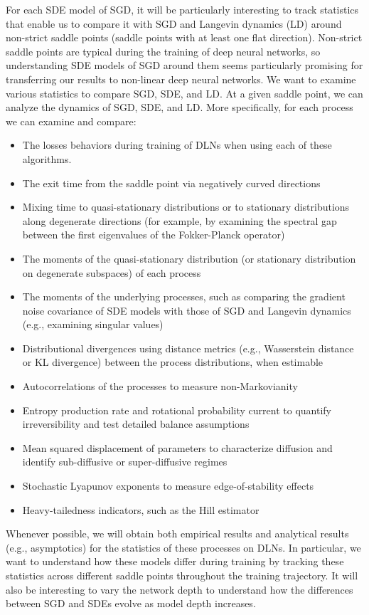\documentclass[11pt]{article}
\begin{document}
For each SDE model of SGD, it will be particularly interesting to track statistics that enable us to compare it with SGD and Langevin dynamics (LD) around non-strict saddle points (saddle points with at least one flat direction). Non-strict saddle points are typical during the training of deep neural networks, so understanding SDE models of SGD around them seems particularly promising for transferring our results to non-linear deep neural networks.
We want to examine various statistics to compare SGD, SDE, and LD. At a given saddle point, we can analyze the dynamics of SGD, SDE, and LD. More specifically, for each process we can examine and compare:
\begin{itemize}
\item The losses behaviors during training of DLNs when using each of these algorithms.
\item The exit time from the saddle point via negatively curved directions
\item Mixing time to quasi-stationary distributions or to stationary distributions along degenerate directions (for example, by examining the spectral gap between the first eigenvalues of the Fokker-Planck operator)
\item The moments of the quasi-stationary distribution (or stationary distribution on degenerate subspaces) of each process
\item The moments of the underlying processes, such as comparing the gradient noise covariance of SDE models with those of SGD and Langevin dynamics (e.g., examining singular values)
\item Distributional divergences using distance metrics (e.g., Wasserstein distance or KL divergence) between the process distributions, when estimable
\item Autocorrelations of the processes to measure non-Markovianity
\item Entropy production rate and rotational probability current to quantify irreversibility and test detailed balance assumptions
\item Mean squared displacement of parameters to characterize diffusion and identify sub-diffusive or super-diffusive regimes
\item Stochastic Lyapunov exponents to measure edge-of-stability effects
\item Heavy-tailedness indicators, such as the Hill estimator
\end{itemize}
Whenever possible, we will obtain both empirical results and analytical results (e.g., asymptotics) for the statistics of these processes on DLNs. In particular, we want to understand how these models differ during training by tracking these statistics across different saddle points throughout the training trajectory. It will also be interesting to vary the network depth to understand how the differences between SGD and SDEs evolve as model depth increases.
\end{document}
